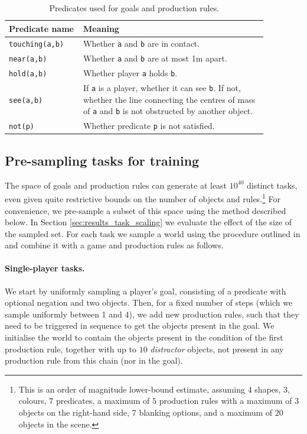 \begin{longtable}{>{\raggedright}p{0.25\linewidth}|p{0.62\linewidth}}
    \caption{Predicates used for goals and production rules.}
    \label{tab:predicates}
    \\ \hline
      \textbf{Predicate name} & \textbf{Meaning} \\
      \hline
      \texttt{touching(a,b)} & Whether \texttt{a} and \texttt{b} are in contact. \\
      \hline
      \texttt{near(a,b)} & Whether \texttt{a} and \texttt{b} are at most 1m apart.\\
      \hline
      \texttt{hold(a,b)} & Whether player \texttt{a} holds \texttt{b}.\\
      \hline
      \texttt{see(a,b)} & If \texttt{a} is a player, whether it can see \texttt{b}. If not, whether the line connecting the centres of mass of \texttt{a} and \texttt{b} is not obstructed by another object.\\
      \hline
      \texttt{not(p)} & Whether predicate \texttt{p} is not satisfied. \\
      \hline
\end{longtable}

\subsection{Pre-sampling tasks for training} \label{app:presample_tasks}

The space of goals and production rules can generate at least $10^{40}$ distinct tasks, even given quite restrictive bounds on the number of objects and rules.\footnote{This is an order of magnitude lower-bound estimate, assuming $4$ shapes, $3$, colours, $7$ predicates, a maximum of $5$ production rules with a maximum of $3$ objects on the right-hand side, $7$ blanking options, and a maximum of $20$ objects in the scene.} For convenience, we pre-sample a subset of this space using the method described below. In Section \ref{sec:results_task_scaling} we evaluate the effect of the size of the sampled set. For each task we sample a world using the procedure outlined in \citet{xland} and combine it with a game and production rules as follows.

\paragraph{Single-player tasks.} We start by uniformly sampling a player's goal, consisting of a predicate with optional negation and two objects. Then, for a fixed number of steps (which we sample uniformly between 1 and 4), we add new production rules, such that they need to be triggered in sequence to get the objects present in the goal. We initialise the world to contain the objects present in the condition of the first production rule, together with up to $10$ \textit{distractor} objects, not present in any production rule from this chain (nor in the goal).

